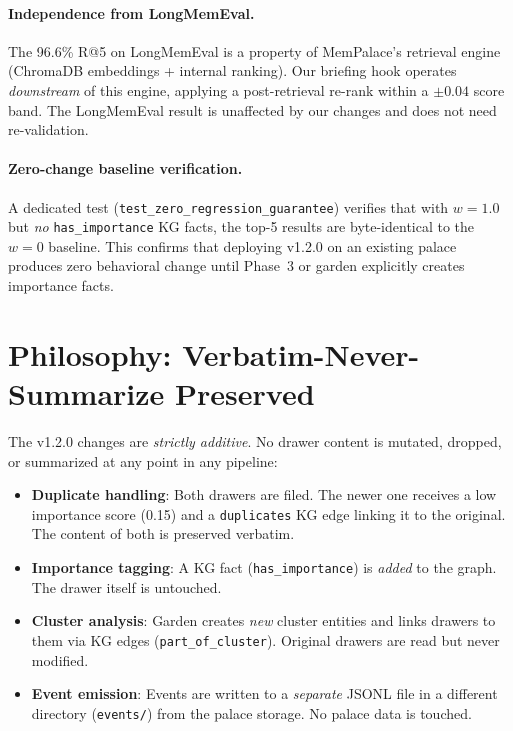 \documentclass[11pt]{article}
\begin{document}
\paragraph{Independence from LongMemEval.}
The 96.6\% R@5 on LongMemEval is a property of MemPalace's retrieval
engine (ChromaDB embeddings + internal ranking). Our briefing hook
operates \emph{downstream} of this engine, applying a post-retrieval
re-rank within a $\pm 0.04$ score band. The LongMemEval result is
unaffected by our changes and does not need re-validation.

\paragraph{Zero-change baseline verification.}
A dedicated test (\texttt{test\_zero\_regression\_guarantee}) verifies
that with $w = 1.0$ but \emph{no} \texttt{has\_importance} KG facts,
the top-5 results are byte-identical to the $w = 0$ baseline. This
confirms that deploying v1.2.0 on an existing palace produces zero
behavioral change until Phase~3 or garden explicitly creates importance
facts.

\section{Philosophy: Verbatim-Never-Summarize Preserved}

The v1.2.0 changes are \emph{strictly additive}. No drawer content is
mutated, dropped, or summarized at any point in any pipeline:

\begin{itemize}[nosep]
    \item \textbf{Duplicate handling}: Both drawers are filed. The newer
          one receives a low importance score (0.15) and a
          \texttt{duplicates} KG edge linking it to the original. The
          content of both is preserved verbatim.
    \item \textbf{Importance tagging}: A KG fact
          (\texttt{has\_importance}) is \emph{added} to the graph. The
          drawer itself is untouched.
    \item \textbf{Cluster analysis}: Garden creates \emph{new} cluster
          entities and links drawers to them via KG edges
          (\texttt{part\_of\_cluster}). Original drawers are read but
          never modified.
    \item \textbf{Event emission}: Events are written to a
          \emph{separate} JSONL file in a different directory
          (\texttt{events/}) from the palace storage. No palace data
          is touched.
\end{itemize}
\end{document}
